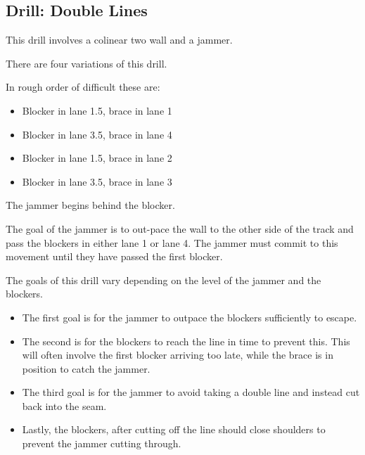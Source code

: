 \subsection*{Drill: Double Lines}
\label{drill:two_wall/double_lines}
This drill involves a colinear two wall and a jammer.

There are four variations of this drill.

In rough order of difficult these are:
\begin{itemize}
\item Blocker in lane 1.5, brace in lane 1
\item Blocker in lane 3.5, brace in lane 4
\item Blocker in lane 1.5, brace in lane 2
\item Blocker in lane 3.5, brace in lane 3
\end{itemize} 

The jammer begins behind the blocker.

The goal of the jammer is to out-pace the wall to the other side of the track and pass the blockers in either lane 1 or lane 4.
The jammer must commit to this movement until they have passed the first blocker. 


The goals of this drill vary depending on the level of the jammer and the blockers.

\begin{itemize}
\item The first goal is for the jammer to outpace the blockers sufficiently to escape.
\item The second is for the blockers to reach the line in time to prevent this. This will often involve the first blocker arriving too late, while the brace is in position to catch the jammer.
\item The third goal is for the jammer to avoid taking a double line and instead cut back into the seam.
\item Lastly, the blockers, after cutting off the line should close shoulders to prevent the jammer cutting through.
\end{itemize}

